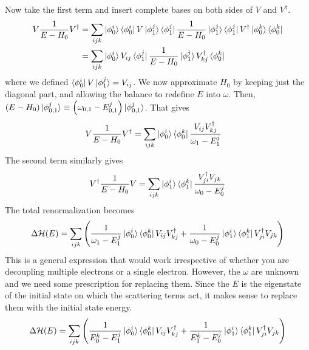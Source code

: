 \documentclass[twoside]{report}
\numberwithin{equation}{section}
\begin{document}
Now take the first term and insert complete bases on both sides of \(V\) and \(V^\dagger\).
\begin{equation}\begin{aligned}
V\frac{1}{E - H_0}V^\dagger &= \sum_{ijk}\ket{\phi_0^i}\bra{\phi_0^i}V\ket{\phi_1^j}\bra{\phi_1^j}\frac{1}{E - H_0}\ket{\phi_1^j}\bra{\phi_1^j}V^\dagger\ket{\phi_0^k}\bra{\phi_0^k} \\
                &= \sum_{ijk}\ket{\phi_0^i}V_{ij}\bra{\phi_1^j}\frac{1}{E - H_0}\ket{\phi_1^j}V^\dagger_{kj}\bra{\phi_0^k}\\
\end{aligned}\end{equation}
where we defined \(\bra{\phi_0^i}V\ket{\phi_1^j} = V_{ij}\). We now approximate \(H_0\) by keeping just the diagonal part, and allowing the balance to redefine \(E\) into \(\omega\). Then, \(\left(E - H_0\right) \ket{\phi_{0,1}^j} \equiv \left(\omega_{0,1} - E_{0,1}^j\right) \ket{\phi_{0,1}^j}\). That gives
\begin{equation}\begin{aligned}
V\frac{1}{E - H_0}V^\dagger &= \sum_{ijk}\ket{\phi_0^i}\bra{\phi_0^k}\frac{V_{ij}V^\dagger_{kj}}{\omega_1 - E^j_1}
\end{aligned}\end{equation}
The second term similarly gives
\begin{equation}\begin{aligned}
V^\dagger\frac{1}{E - H_0}V = \sum_{ijk}\ket{\phi_1^i}\bra{\phi_1^k}\frac{V^\dagger_{ji}V_{jk}}{\omega_0 - E^j_0}
\end{aligned}\end{equation}
The total renormalization becomes
\begin{equation}\begin{aligned}
	\Delta \mathcal{H}(E) = \sum_{ijk}\left(\frac{1}{\omega_1 - E^j_1}\ket{\phi_0^i}\bra{\phi_0^k}V_{ij}V^\dagger_{kj} + \frac{1}{\omega_0 - E^j_0}\ket{\phi_1^i}\bra{\phi_1^k}V^\dagger_{ji}V_{jk}\right)
\end{aligned}\end{equation}
This is a general expression that would work irrespective of whether you are decoupling multiple electrons or a single electron. However, the \(\omega\) are unknown and we need some prescription for replacing them. Since the \(E\) is the eigenstate of the initial state on which the scattering terms act, it makes sense to replace them with the initial state energy.
\begin{equation}\begin{aligned}
	\Delta \mathcal{H}(E) = \sum_{ijk}\left(\frac{1}{E_0^k - E^j_1}\ket{\phi_0^i}\bra{\phi_0^k}V_{ij}V^\dagger_{kj} + \frac{1}{E_1^k - E^j_0}\ket{\phi_1^i}\bra{\phi_1^k}V^\dagger_{ji}V_{jk}\right)
\end{aligned}\end{equation}
\end{document}
